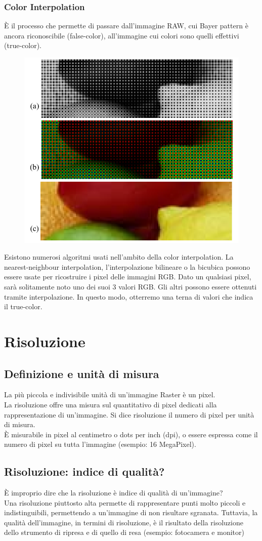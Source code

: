\documentclass{report}
\begin{document}
	\subsection{Color Interpolation}
	È il processo che permette di passare dall'immagine RAW, cui Bayer pattern è ancora riconoscibile (false-color), all'immagine cui colori sono quelli effettivi (true-color).
	
	\begin{figure}[htp]
		\centering
		\includegraphics[width=0.5\linewidth]{colorinterp.png}
	\end{figure}
	Esistono numerosi algoritmi usati nell'ambito della color interpolation.
	La nearest-neighbour interpolation, l'interpolazione bilineare o la bicubica possono essere usate per ricostruire i pixel delle immagini RGB.
	Dato un qualsiasi pixel, sarà solitamente noto uno dei suoi 3 valori RGB. Gli altri possono essere ottenuti tramite interpolazione. In questo modo, otterremo una terna di valori che indica il true-color.
	\newpage
	\chapter{Risoluzione}
	\section{Definizione e unità di misura}
	La più piccola e indivisibile unità di un'immagine Raster è un pixel.\\
	La risoluzione offre una misura sul quantitativo di pixel dedicati alla rappresentazione di un'immagine.
	Si dice risoluzione il numero di pixel per unità di misura.\\
	È misurabile in pixel al centimetro o dots per inch (dpi), o essere espressa come il numero di pixel su tutta l'immagine (esempio: 16 MegaPixel).
	\section{Risoluzione: indice di qualità?}
	È improprio dire che la risoluzione è indice di qualità di un'immagine?\\
	Una risoluzione piuttosto alta permette di rappresentare punti molto piccoli e indistinguibili, permettendo a un'immagine di non risultare sgranata.
	Tuttavia, la qualità dell'immagine, in termini di risoluzione, è il risultato della risoluzione dello strumento di ripresa e di quello di resa (esempio: fotocamera e monitor)
\end{document}
